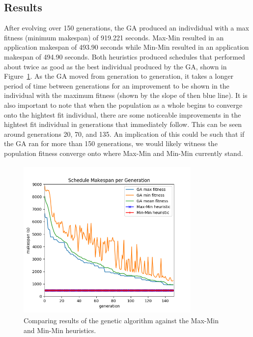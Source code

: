 \subsection*{Results}
After evolving over 150 generations, the GA produced an indivdidual with a
max fitness (minimum makespan) of 919.221 seconds. Max-Min resulted in an
application makespan of 493.90 seconds while Min-Min resulted in an application
makespan of 494.90 seconds. Both heuristics produced schedules that performed
about twice as good as the best individual produced by the GA, shown in
Figure~\ref{fig:results}. As the GA moved from generation to generation, it
takes a longer period of time between generations for an improvement to be
shown in the individual with the maximum fitness (shown by the slope of then blue line). It is also important to note
that when the population as a whole begins to converge onto the hightest fit
individual, there are some noticeable improvements in the hightest fit
individual in generations that immediately follow. This can be seen around generations 20, 70, and 135. An implication
of this could be such that if the GA ran for more than 150 generations, we
would likely witness the population fitness converge onto where Max-Min and Min-Min
currently stand.
\begin{figure}[t!]
  \centering
  \includegraphics[width=90mm, height=80mm]{figures/results.png}
  \caption{Comparing results of the genetic algorithm against the Max-Min and Min-Min heuristics.}
  \label{fig:results}
\end{figure}

